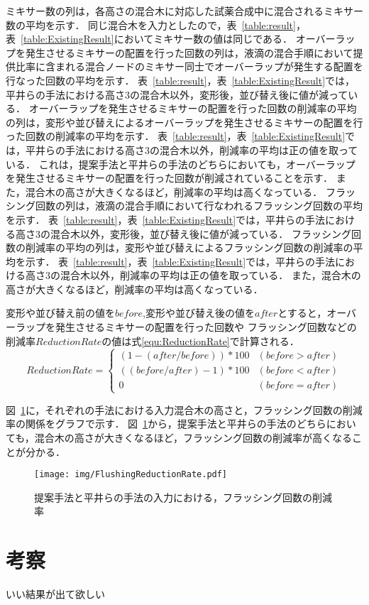 ミキサー数の列は，各高さの混合木に対応した試薬合成中に混合されるミキサー数の平均を示す．
同じ混合木を入力としたので，表~\ref{table:result}，表~\ref{table:ExistingResult}においてミキサー数の値は同じである．
オーバーラップを発生させるミキサーの配置を行った回数の列は，液滴の混合手順において提供比率に含まれる混合ノードのミキサー同士でオーバーラップが発生する配置を行なった回数の平均を示す．
表~\ref{table:result}，表~\ref{table:ExistingResult}では，平井らの手法における高さ3の混合木以外，変形後，並び替え後に値が減っている．
オーバーラップを発生させるミキサーの配置を行った回数の削減率の平均の列は，変形や並び替えによるオーバーラップを発生させるミキサーの配置を行った回数の削減率の平均を示す．
表~\ref{table:result}，表~\ref{table:ExistingResult}では，平井らの手法における高さ3の混合木以外，削減率の平均は正の値を取っている．
これは，提案手法と平井らの手法のどちらにおいても，オーバーラップを発生させるミキサーの配置を行った回数が削減されていることを示す．
また，混合木の高さが大きくなるほど，削減率の平均は高くなっている．
フラッシング回数の列は，液滴の混合手順において行なわれるフラッシング回数の平均を示す．
表~\ref{table:result}，表~\ref{table:ExistingResult}では，平井らの手法における高さ3の混合木以外，変形後，並び替え後に値が減っている．
フラッシング回数の削減率の平均の列は，変形や並び替えによるフラッシング回数の削減率の平均を示す．
表~\ref{table:result}，表~\ref{table:ExistingResult}では，平井らの手法における高さ3の混合木以外，削減率の平均は正の値を取っている．
また，混合木の高さが大きくなるほど，削減率の平均は高くなっている．

変形や並び替え前の値を$before$,変形や並び替え後の値を$after$とすると，オーバーラップを発生させるミキサーの配置を行った回数や
フラッシング回数などの削減率$ReductionRate$の値は式\ref{equ:ReductionRate}で計算される．
\begin{equation}
    ReductionRate = 
        \begin{cases}
            (1-(after/before))*100 & (before > after)\\
            ((before/after)-1)*100 & (before < after)\\
            0 & (before = after)
        \end{cases}
    \label{equ:ReductionRate}
\end{equation}

図~\ref{fig:FlushingReductionRate}に，それぞれの手法における入力混合木の高さと，フラッシング回数の削減率の関係をグラフで示す．
図~\ref{fig:FlushingReductionRate}から，提案手法と平井らの手法のどちらにおいても，混合木の高さが大きくなるほど，フラッシング回数の削減率が高くなることが分かる．

\begin{figure}[tbp]
 \centering\texttt{[image: img/FlushingReductionRate.pdf]}

 \caption{提案手法と平井らの手法の入力における，フラッシング回数の削減率}\label{fig:FlushingReductionRate}
\end{figure}

\section{考察}
いい結果が出て欲しい
